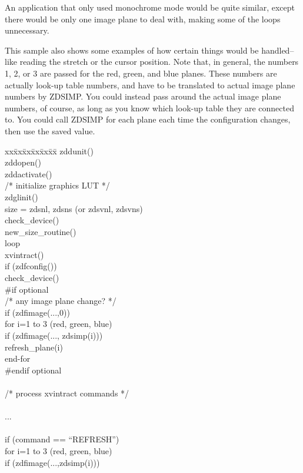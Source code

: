 An application that only used monochrome mode would be quite similar,
except there would be only one image plane to deal with, making some of
the loops unnecessary.

This sample also shows some examples of how certain things would be
handled--like reading the stretch or the cursor position.  Note that,
in general, the numbers 1, 2, or 3 are passed for the red, green, and
blue planes.  These numbers are actually look-up table numbers, and
have to be translated to actual image plane numbers by ZDSIMP.  You
could instead pass around the actual image plane numbers, of course,
as long as you know which look-up table they are connected to.  You
could call ZDSIMP for each plane each time the configuration changes,
then use the saved value.
\begin{tabbing}
xx\=xx\=xx\=xx\=xx\=xx\=\kill
\>zddunit()\\
\>zddopen()\\
\>zddactivate()\\
\>/*  initialize graphics LUT  */\\
\>zdglinit()\\
\>size = zdsnl, zdsns (or zdsvnl, zdsvns)\\
\>check\_device()\\
\>new\_size\_routine()\\
\>loop\\
\>\>xvintract()\\
\>\>if (zdfconfig())\\
\>\>check\_device()\\
\>\#if optional\\
\>\>/*  any image plane change?  */\\
\>\>if (zdfimage(...,0))\\
\>\>\>for i=1 to 3  (red, green, blue)\\
\>\>\>\>if (zdfimage(..., zdsimp(i)))\\
\>\>\>\>\>refresh\_plane(i)\\
\>\>\>end-for\\
\>\#endif optional\\
  \\
\>\>/*  process xvintract commands  */\\
  \\
\>\>...\\
  \\
\>\>if (command == ``REFRESH'')\\
\>\>\>for i=1 to 3 (red, green, blue)\\
\>\>\>\>if (zdfimage(...,zdsimp(i)))\\

\end{tabbing}
